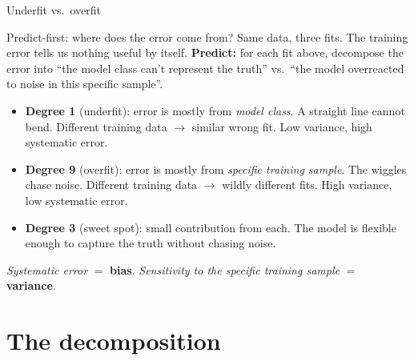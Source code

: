 \documentclass[aspectratio=169]{beamer}
\begin{document}
\begin{frame}{Underfit vs.\ overfit}
\begin{center}
  \end{center}
\end{frame}

\begin{frame}{Predict-first: where does the error come from?}
  Same data, three fits. The training error tells us nothing useful by itself.
  \vfill
  \pause
  \textbf{Predict:} for each fit above, decompose the error into ``the model class can't represent the truth'' vs.\ ``the model overreacted to noise in this specific sample''.
  \pause
  \vfill
  \begin{itemize}\small
    \item \textbf{Degree 1} (underfit): error is mostly from \emph{model class}. A straight line cannot bend. Different training data $\to$ similar wrong fit. Low variance, high systematic error.
    \item \textbf{Degree 9} (overfit): error is mostly from \emph{specific training sample}. The wiggles chase noise. Different training data $\to$ wildly different fits. High variance, low systematic error.
    \item \textbf{Degree 3} (sweet spot): small contribution from each. The model is flexible enough to capture the truth without chasing noise.
  \end{itemize}
  \vfill
  \emph{Systematic error} $=$ \textbf{bias}. \emph{Sensitivity to the specific training sample} $=$ \textbf{variance}.
\end{frame}

\section{The decomposition}
\end{document}

